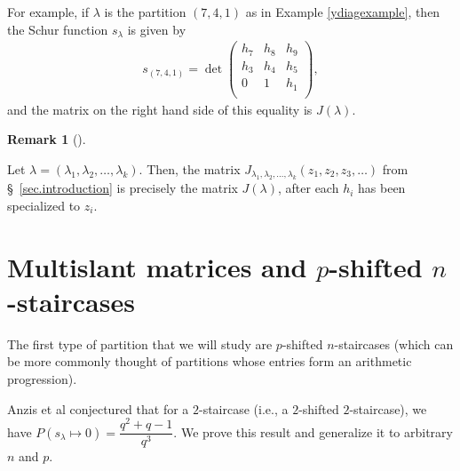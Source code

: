 \documentclass[numbers=enddot,12pt,final,onecolumn,notitlepage]{scrartcl}%
\theoremstyle{definition}
\newtheorem{defi}[theo]{Definition}
\newenvironment{definition}[1][]
{\begin{defi}[#1]\begin{leftbar}}
{\end{leftbar}\end{defi}}
\newtheorem{remk}[theo]{Remark}
\newenvironment{remark}[1][]
{\begin{remk}[#1]\begin{leftbar}}
{\end{leftbar}\end{remk}}
\newcommand{\NN}{\mathbb{N}}
\newcommand{\tup}[1]{\left( #1 \right)}
\theoremstyle{plainsl}
\begin{document}
For example, if $\lambda$ is the partition $(7,4,1)$ as in Example \ref{ydiagexample}, then the Schur function $s_\lambda$ is given by
\begin{align*}
s_{(7,4,1)} =
\det
\begin{pmatrix}
h_7 & h_8 & h_9 \\ 
h_3 & h_4 & h_5 \\
0 & 1 & h_1 \\
\end{pmatrix} ,
\end{align*}
and the matrix on the right hand side of this equality is $J\tup{\lambda}$.


\begin{remark}
Let
$\lambda = \tup{\lambda_1, \lambda_2, \ldots, \lambda_k}$.
Then, the matrix
$J_{\lambda_1, \lambda_2, \ldots, \lambda_k}\tup{z_1, z_2, z_3, \ldots}$
from \S~\ref{sec.introduction} is precisely the matrix
$J\tup{\lambda}$, after each $h_i$ has been specialized to $z_i$.
\end{remark}

\section{Multislant matrices and $p$-shifted $n$-staircases}

The first type of partition that we will study are $p$-shifted $n$-staircases (which can be more commonly thought of partitions whose entries form an arithmetic progression).


Anzis et al \cite{Anzis18} conjectured that for a $2$-staircase (i.e., a $2$-shifted $2$-staircase), we have $P(s_{\lambda} \longmapsto 0) = \dfrac{q^2+q -1}{q^3}$. We prove this result and generalize it to arbitrary $n$ and $p$.
\end{document}
